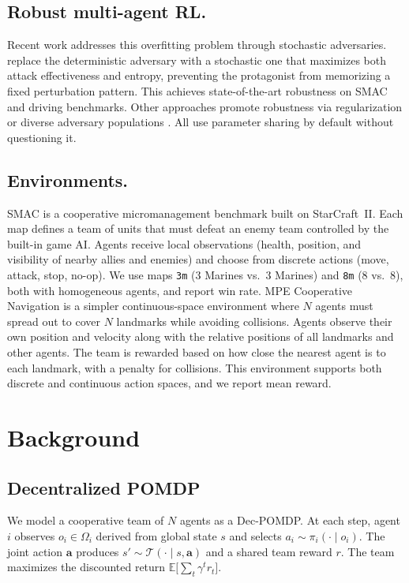 \documentclass{article}
\begin{document}
\subsection{Robust multi-agent RL.}
Recent work addresses this overfitting problem through stochastic adversaries. \citet{zhou2025robust} replace the deterministic adversary with a stochastic one that maximizes both attack effectiveness and entropy, preventing the protagonist from memorizing a fixed perturbation pattern. This achieves state-of-the-art robustness on SMAC and driving benchmarks. Other approaches promote robustness via regularization \citep{bukharin2023ernie} or diverse adversary populations \citep{vinitsky2020rap, yuan2023romance}. All use parameter sharing by default without questioning it.

\subsection{Environments.}
SMAC \citep{samvelyan2019smac} is a cooperative micromanagement benchmark built on StarCraft~II. Each map defines a team of units that must defeat an enemy team controlled by the built-in game AI. Agents receive local observations (health, position, and visibility of nearby allies and enemies) and choose from discrete actions (move, attack, stop, no-op). We use maps \texttt{3m} (3 Marines vs.\ 3 Marines) and \texttt{8m} (8 vs.\ 8), both with homogeneous agents, and report win rate.
MPE Cooperative Navigation \citep{mordatch2018mpe} is a simpler continuous-space environment where $N$ agents must spread out to cover $N$ landmarks while avoiding collisions. Agents observe their own position and velocity along with the relative positions of all landmarks and other agents. The team is rewarded based on how close the nearest agent is to each landmark, with a penalty for collisions. This environment supports both discrete and continuous action spaces, and we report mean reward.



\section{Background}
\label{sec:background}

\subsection{Decentralized POMDP}
We model a cooperative team of $N$ agents as a Dec-POMDP. At each step, agent $i$ observes $o_i \in \Omega_i$ derived from global state $s$ and selects $a_i \sim \pi_i(\cdot \mid o_i)$. The joint action $\mathbf{a}$ produces $s' \sim \mathcal{T}(\cdot \mid s, \mathbf{a})$ and a shared team reward $r$. The team maximizes the discounted return $\mathbb{E}\big[\sum_t \gamma^t r_t\big]$.
\end{document}
